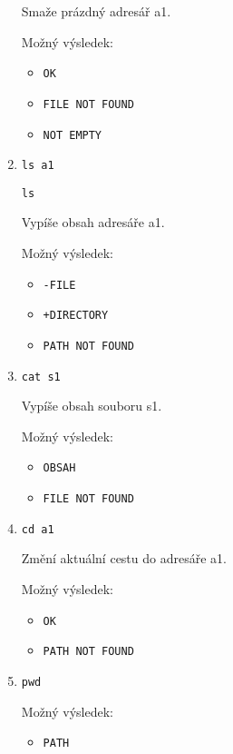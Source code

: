 \documentclass[a4paper, 12pt]{report}
\begin{document}
\begin{enumerate}
    Smaže prázdný adresář a1.

    Možný výsledek:

    \begin{itemize}
        \item[] \texttt{OK}
        \item[] \texttt{FILE NOT FOUND}
        \item[] \texttt{NOT EMPTY}
    \end{itemize}

    \item \texttt{ls a1}

    \texttt{ls}

    Vypíše obsah adresáře a1.

    Možný výsledek:

    \begin{itemize}
        \item[] \texttt{-FILE}
        \item[] \texttt{+DIRECTORY}
        \item[] \texttt{PATH NOT FOUND}
    \end{itemize}

    \item \texttt{cat s1}

    Vypíše obsah souboru s1.

    Možný výsledek:

    \begin{itemize}
        \item[] \texttt{OBSAH}
        \item[] \texttt{FILE NOT FOUND}
    \end{itemize}

    \item \texttt{cd a1}

    Změní aktuální cestu do adresáře a1.

    Možný výsledek:

    \begin{itemize}
        \item[] \texttt{OK}
        \item[] \texttt{PATH NOT FOUND}
    \end{itemize}

    \item \texttt{pwd}

    Možný výsledek:

    \begin{itemize}
        \item[] \texttt{PATH}
    \end{itemize}


\end{enumerate}
\end{document}
